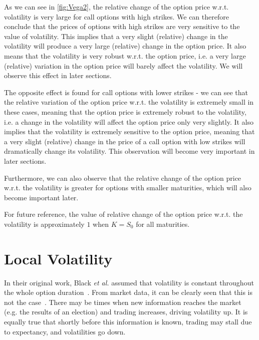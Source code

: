 As we can see in \autoref{fig:Vega2}, the relative change of the option price w.r.t. volatility is very large for call options with high strikes. We can therefore conclude that the prices of options with high strikes are very sensitive to the value of volatility. This implies that a very slight (relative) change in the volatility will produce a very large (relative) change in the option price. It also means that the volatility is very robust w.r.t. the option price, i.e. a very large (relative) variation in the option price will barely affect the volatility. We will observe this effect in later sections.

The opposite effect is found for call options with lower strikes - we can see that the relative variation of the option price w.r.t. the volatility is extremely small in these cases, meaning that the option price is extremely robust to the volatility, i.e. a change in the volatility will affect the option price only very slightly. It also implies that the volatility is extremely sensitive to the option price, meaning that a very slight (relative) change in the price of a call option with low strikes will dramatically change its volatility. This observation will become very important in later sections.

Furthermore, we can also observe that the relative change of the option price w.r.t. the volatility is greater for options with smaller maturities, which will also become important later.

For future reference, the value of relative change of the option price w.r.t. the volatility is approximately $1$ when $K=S_0$ for all maturities.

\vfill
\newpage

\section{Local Volatility}
\label{section:localvolatility}
In their original work, Black \textit{et al.} assumed that volatility is constant throughout the whole option duration~\citep{Scholes}. From market data, it can be clearly seen that this is not the case~\citep{DJIA}. There may be times when new information reaches the market  (e.g. the results of an election) and trading increases, driving volatility up. It is equally true that shortly before this information is known, trading may stall due to expectancy, and volatilities go down.

